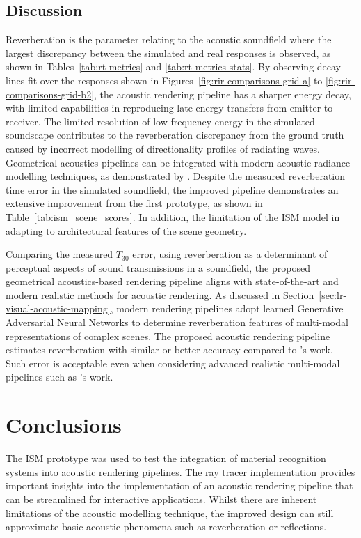 \subsection{Discussion}
Reverberation is the parameter relating to the acoustic soundfield where the largest discrepancy between the simulated and real responses is observed, as shown in Tables~\ref{tab:rt-metrics} and \ref{tab:rt-metrics-stats}. By observing decay lines fit over the responses shown in Figures~\ref{fig:rir-comparisons-grid-a} to \ref{fig:rir-comparisons-grid-b2}, the acoustic rendering pipeline has a sharper energy decay, with limited capabilities in reproducing late energy transfers from emitter to receiver. The limited resolution of low-frequency energy in the simulated soundscape contributes to the reverberation discrepancy from the ground truth caused by incorrect modelling of directionality profiles of radiating waves. Geometrical acoustics pipelines can be integrated with modern acoustic radiance modelling techniques, as demonstrated by \cite{siltanen2010room}. Despite the measured reverberation time error in the simulated soundfield, the improved pipeline demonstrates an extensive improvement from the first prototype, as shown in Table~\ref{tab:ism_scene_scores}. In addition, the limitation of the ISM model in adapting to architectural features of the scene geometry. \par
Comparing the measured $T_{30}$ error, using reverberation as a determinant of perceptual aspects of sound transmissions in a soundfield, the proposed geometrical acoustics-based rendering pipeline aligns with state-of-the-art and modern realistic methods for acoustic rendering. As discussed in Section~\ref{sec:lr-visual-acoustic-mapping}, modern rendering pipelines adopt learned Generative Adversarial Neural Networks to determine reverberation features of multi-modal representations of complex scenes. The proposed acoustic rendering pipeline estimates reverberation with similar or better accuracy compared to \cite{Singh_2021_ICCV}'s work. Such error is acceptable even when considering advanced realistic multi-modal pipelines such as \cite{schissler2014high}'s work. \par


\section{Conclusions}
The ISM prototype was used to test the integration of material recognition systems into acoustic rendering pipelines. 
The ray tracer implementation provides important insights into the implementation of an acoustic rendering pipeline that can be streamlined for interactive applications. Whilst there are inherent limitations of the acoustic modelling technique, the improved design can still approximate basic acoustic phenomena such as reverberation or reflections.